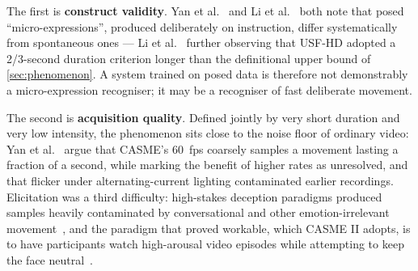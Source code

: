 The first is \textbf{construct validity}. Yan et al.~\cite{yan2014} and Li et al.~\cite{liX2013} both note that posed ``micro-expressions'', produced deliberately on instruction, differ systematically from spontaneous ones --- Li et al.~\cite{liX2013} further observing that USF-HD adopted a 2/3-second duration criterion longer than the definitional upper bound of \autoref{sec:phenomenon}. A system trained on posed data is therefore not demonstrably a micro-expression recogniser; it may be a recogniser of fast deliberate movement.

The second is \textbf{acquisition quality}. Defined jointly by very short duration and very low intensity, the phenomenon sits close to the noise floor of ordinary video: Yan et al.~\cite{yan2014} argue that CASME's 60~fps coarsely samples a movement lasting a fraction of a second, while marking the benefit of higher rates as unresolved, and that flicker under alternating-current lighting contaminated earlier recordings. Elicitation was a third difficulty: high-stakes deception paradigms produced samples heavily contaminated by conversational and other emotion-irrelevant movement~\cite{yan2014}, and the paradigm that proved workable, which CASME II adopts, is to have participants watch high-arousal video episodes while attempting to keep the face neutral~\cite{liX2013}.

